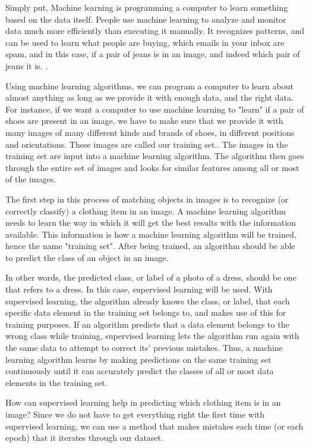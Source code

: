 \documentclass[12pt]{article} %
\begin{document}
Simply put, Machine learning is programming a computer to learn something based on the data itself. People use machine learning to analyze and monitor data much more efficiently than executing it manually. It recognizes patterns, and can be used to learn what people are buying, which emails in your inbox are spam, and in this case, if a pair of jeans is in an image, and indeed which pair of jeans it is. \cite{aurelienMachineLearning}. 

Using machine learning algorithms, we can program a computer to learn about almost anything as long as we provide it with enough data, and the right data. For instance, if we want a computer to use machine learning to "learn" if a pair of shoes are present in an image, we have to make sure that we provide it with many images of many different kinds and brands of shoes, in different positions and orientations. These images are called our training set.\cite{aurelienMachineLearning}. The images in the training set are input into a machine learning algorithm. The algorithm then goes through the entire set of images and looks for similar features among all or most of the images. 
	
	The first step in this process of matching objects in images is to recognize (or correctly classify) a clothing item in an image. A machine learning algorithm needs to learn the way in which it will get the best results with the information available. This information is how a machine learning algorithm will be trained, hence the name "training set". After being trained, an algorithm should be able to predict the class of an object in an image. 

In other words, the predicted class, or label of a photo of a dress, should be one that refers to a dress. In this case, supervised learning will be used. With supervised learning, the algorithm already knows the class, or label, that each specific data element in the training set belongs to, and makes use of this for training purposes. If an algorithm predicts that a data element belongs to the wrong class while training, supervised learning lets the algorithm run again with the same data to attempt to correct its' previous mistakes\cite{aurelienMachineLearning}. Thus, a machine learning algorithm learns by making predictions on the same training set continuously until it can accurately predict the classes of all or most data elements in the training set. 
	
	How can supervised learning help in predicting which clothing item is in an image? Since we do not have to get everything right the first time with supervised learning, we can use a method that makes mistakes each time (or each epoch) that it iterates through our dataset. 
\end{document}
